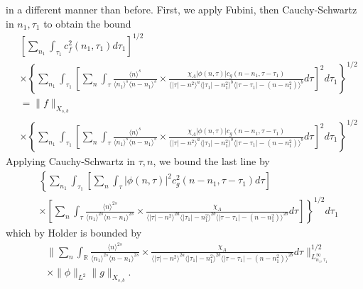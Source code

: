 \documentclass[12pt,reqno]{amsart}
\numberwithin{equation}{section}  %
\newcommand{\rr}{\mathbb{R}}
\begin{document}
in a different manner than before. First, we apply 
Fubini, then Cauchy-Schwartz in $n_{1}, \tau_{1}$ to obtain the bound
%
%
\begin{equation*}
\begin{split}
  & \left[ \sum_{n_{1}} \int_{\tau_{1}} c_{f}^{2}(n_{1}, \tau_{1}) d \tau_{1}
  \right]^{1/2}
  \\
  & \times \left \{\sum_{n_{1}} \int_{\tau_{1}}   
 \left[
 \sum_{n} \int_{\tau}
   \frac{\langle n \rangle ^{s}}{\langle n_{1} \rangle ^{s} \langle
   n - n_{1}\rangle ^{s}} \times \frac{\chi_{A} |\phi(n, \tau)| c_{g}(n -
   n_{1}, \tau - \tau_{1})
}{\langle | \tau | - n^{2} \rangle
  ^{a} \langle | \tau_{1} | - n_{1}^{2} \rangle ^{b} \langle | \tau -
  \tau_{1} | - (n - n_{1}^{2}) \rangle ^{b}} d \tau 
  \right]^{2} d \tau_{1} \right \}^{1/2}
  \\
  & = \| f \|_{X_{s,b}}
  \\
  & \times \left \{\sum_{n_{1}} \int_{\tau_{1}}   
 \left[
 \sum_{n} \int_{\tau}
   \frac{\langle n \rangle ^{s}}{\langle n_{1} \rangle ^{s} \langle
   n - n_{1}\rangle ^{s}} \times \frac{\chi_{A}|\phi(n, \tau)| c_{g}(n -
   n_{1}, \tau - \tau_{1})
}{\langle | \tau | - n^{2} \rangle
  ^{a} \langle | \tau_{1} | - n_{1}^{2} \rangle ^{b} \langle | \tau -
  \tau_{1} | - (n - n_{1}^{2}) \rangle ^{b}} d \tau 
  \right]^{2} d \tau_{1}  \right \}^{1/2}
\end{split}
\end{equation*}
%
Applying Cauchy-Schwartz in $\tau, n$, we bound the last line by 
%
%
\begin{equation*}
\begin{split}
  & \left \{\sum_{n_{1}} \int_{\tau_{1}}   
  \left [ \sum_{n} \int_{\tau}
  | \phi(n, \tau)|^{2} c_{g}^{2}(n - n_{1}, \tau - \tau_{1}) d \tau  
    \right ] \right . 
   \\
   & \left. \times \left [ \sum_{n} \int_{\tau} \frac{\langle n \rangle
   ^{2s}}{\langle n_{1} \rangle ^{2s} \langle n - n_{1}\rangle ^{2s}}
   \times \frac{\chi_{A}}{\langle | \tau | - n^{2} \rangle ^{2a} \langle | \tau_{1} |
   - n_{1}^{2} \rangle^{2b}  \langle | \tau - \tau_{1} | - (n - n_{1}^{2})
   \rangle^{2b}} d \tau  \right ] \right \}^{1/2}d \tau_{1} 
\end{split}
\end{equation*}
%
%
which by Holder is bounded by 
%
%
%
\begin{equation}
  \label{integral-bound-2nd-form-per}
\begin{split}
  & \| \sum_{n} \int_{\rr} \frac{\langle n \rangle ^{2s}}{\langle n_{1} \rangle ^{2s} \langle
  n - n_{1}\rangle ^{2s}}  \times \frac{\chi_{A}}{\langle | \tau | - n^{2} \rangle
  ^{2a} \langle | \tau_{1} | - n_{1}^{2} \rangle^{2b}  \langle | \tau -
  \tau_{1} | - (n - n_{1}^{2}) \rangle^{2b}} d \tau 
  \|_{L^{\infty}_{n_{1}, \tau_{1}}}^{1/2}
  \\
  & \times \|\phi\|_{L^{2}} \| g \|_{X_{s,b}}.
\end{split}
\end{equation}
\end{document}
